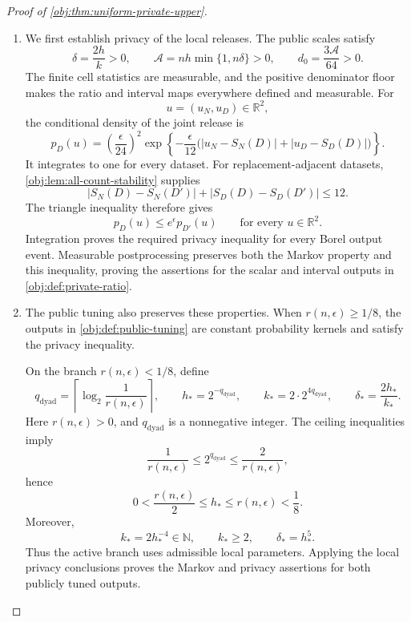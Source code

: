 \documentclass[11pt]{article}
\begin{document}
\begin{proof}[Proof of \cref{obj:thm:uniform-private-upper}]
\begin{enumerate}
\item
We first establish privacy of the local releases. The public scales satisfy
\[
\delta=\frac{2h}{k}>0,
\qquad
\mathcal A=nh\min\{1,n\delta\}>0,
\qquad
d_0=\frac{3\mathcal A}{64}>0.
\]
The finite cell statistics are measurable, and the positive denominator floor makes the ratio and interval maps everywhere defined and measurable. For
\[
u=(u_N,u_D)\in\mathbb R^2,
\]
the conditional density of the joint release is
\[
p_D(u)
=
\left(\frac{\epsilon}{24}\right)^2
\exp\left\{
-\frac{\epsilon}{12}
\bigl(|u_N-S_N(D)|+|u_D-S_D(D)|\bigr)
\right\}.
\]
It integrates to one for every dataset. For replacement-adjacent datasets, \cref{obj:lem:all-count-stability} supplies
\[
|S_N(D)-S_N(D')|+|S_D(D)-S_D(D')|\le12.
\]
The triangle inequality therefore gives
\[
p_D(u)\le e^\epsilon p_{D'}(u)
\qquad\text{for every }u\in\mathbb R^2.
\]
Integration proves the required privacy inequality for every Borel output event. Measurable postprocessing preserves both the Markov property and this inequality, proving the assertions for the scalar and interval outputs in \cref{obj:def:private-ratio}.

\item
The public tuning also preserves these properties. When \(r(n,\epsilon)\ge1/8\), the outputs in \cref{obj:def:public-tuning} are constant probability kernels and satisfy the privacy inequality.

On the branch \(r(n,\epsilon)<1/8\), define
\[
q_{\mathrm{dyad}}
=
\left\lceil\log_2\frac1{r(n,\epsilon)}\right\rceil,
\qquad
h_* =2^{-q_{\mathrm{dyad}}},
\qquad
k_* =2\cdot2^{4q_{\mathrm{dyad}}},
\qquad
\delta_*=\frac{2h_*}{k_*}.
\]
Here \(r(n,\epsilon)>0\), and \(q_{\mathrm{dyad}}\) is a nonnegative integer. The ceiling inequalities imply
\[
\frac1{r(n,\epsilon)}
\le2^{q_{\mathrm{dyad}}}
\le\frac2{r(n,\epsilon)},
\]
hence
\[
0<\frac{r(n,\epsilon)}2
\le h_*
\le r(n,\epsilon)<\frac18.
\]
Moreover,
\[
k_*=2h_*^{-4}\in\mathbb N,
\qquad
k_*\ge2,
\qquad
\delta_*=h_*^5.
\]
Thus the active branch uses admissible local parameters. Applying the local privacy conclusions proves the Markov and privacy assertions for both publicly tuned outputs.


\end{enumerate}
\end{proof}
\end{document}
